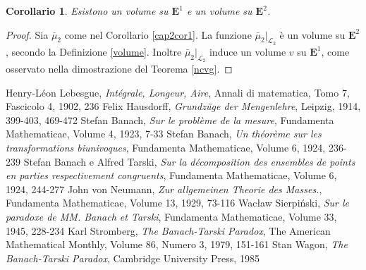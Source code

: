 \documentclass[a4paper,oneside,11pt]{book}
\theoremstyle{definition} \newtheorem{Def}{Definizione}
\theoremstyle{plain} \newtheorem{teo}{Teorema}
\theoremstyle{plain} \newtheorem{cor}[teo]{Corollario}
\theoremstyle{definition} \newtheorem{lem}[teo]{Lemma}
\theoremstyle{plain} \newtheorem{pro}[teo]{Proposizione}
\begin{document}
	\begin{cor}
		Esistono un volume su $\mathbf{E}^1$ e un volume su $\mathbf{E}^2$.
	\end{cor}
	
	\begin{proof}
		Sia $\bar{\mu}_2$ come nel Corollario \ref{cap2cor1}. La funzione $\bar{\mu}_2\big|_{\mathcal{L}_2}$ è un volume su $\mathbf{E}^2$, secondo la Definizione \ref{volume}. Inoltre $\bar{\mu}_2\big|_{\mathcal{L}_2}$ induce un volume $v$ su $\mathbf{E}^1$, come osservato nella dimostrazione del Teorema \ref{ncvg}.
	\end{proof}


\begin{thebibliography}{10}
	 Henry-Léon Lebesgue, \emph{Intégrale, Longeur, Aire}, Annali di matematica, Tomo 7, Fascicolo 4, 1902, 236
	 Felix Hausdorff, \emph{Grundzüge der Mengenlehre}, Leipzig, 1914, 399-403, 469-472
	 Stefan Banach, \emph{Sur le problème de la mesure}, Fundamenta Mathematicae, Volume 4, 1923, 7-33
	 Stefan Banach, \emph{Un théorème sur les transformations biunivoques}, Fundamenta Mathematicae, Volume 6, 1924, 236-239
	 Stefan Banach e Alfred Tarski, \emph{Sur la décomposition des ensembles de points en parties respectivement congruents}, Fundamenta Mathematicae, Volume 6, 1924, 244-277
	 John von Neumann, \emph{Zur allgemeinen Theorie des Masses.}, Fundamenta Mathematicae, Volume 13, 1929, 73-116
	 Wac\l aw Sierpi\'nski, \emph{Sur le paradoxe de MM. Banach et Tarski}, Fundamenta Mathematicae, Volume 33, 1945, 228-234
	 Karl Stromberg, \emph{The Banach-Tarski Paradox}, The American Mathematical Monthly, Volume 86, Numero 3, 1979, 151-161
	 Stan Wagon, \emph{The Banach-Tarski Paradox}, Cambridge University Press, 1985
	
\end{thebibliography}
\end{document}
